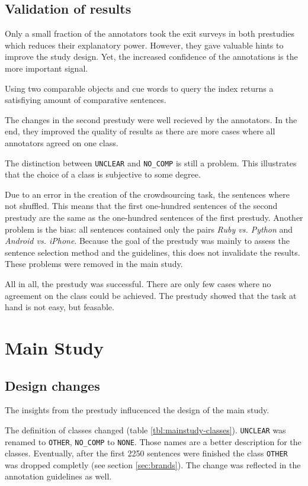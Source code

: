 \subsection{Validation of results}
Only a small fraction of the annotators took the exit surveys in both prestudies which reduces their explanatory power. However, they gave valuable hints to improve the study design. Yet, the increased confidence of the annotations is the more important signal.

Using two comparable objects and cue words to query the index returns a satisfiying amount of comparative sentences.

The changes in the second prestudy were well recieved by the annotators. In the end, they improved the quality of results as there are more cases where all annotators agreed on one class.


The distinction between \texttt{UNCLEAR} and \texttt{NO\_COMP} is still a problem. This illustrates that the choice of a class is subjective to some degree. 

Due to an error in the creation of the crowdsourcing task, the sentences where not shuffled. This means that the first one-hundred sentences of the second prestudy are the same as the one-hundred sentences of the first prestudy. Another problem is the bias: all sentences contained only the pairs \emph{Ruby vs. Python} and \emph{Android vs. iPhone}. Because the goal of the prestudy was mainly to assess the sentence selection method and the guidelines, this does not invalidate the results. These problems were removed in the main study.
\hfill\newline

All in all, the prestudy was successful. There are only few cases where no agreement on the class could be achieved. The prestudy showed that the task at hand is not easy, but feasable.

\newpage
\section{Main Study}
\label{sec:mainstudy}
\subsection{Design changes}
\label{sec:designchanges}
The insights from the prestudy influcenced the design of the main study.

The definition of classes changed (table \ref{tbl:mainstudy-classes}). \texttt{UNCLEAR} was renamed to \texttt{OTHER}, \texttt{NO\_COMP} to \texttt{NONE}. Those names are a better description for the classes. Eventually, after the first 2250 sentences were finished the class \texttt{OTHER} was dropped completly (see section \ref{sec:brands}). The change was reflected in the annotation guidelines as well. 

